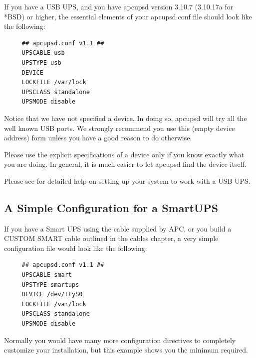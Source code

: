 \label{index-Configuration_002c-USB-65}
\label{index-USB_002c-configuration-66}
\label{index-Example_002c-USB-conf-67}
If you have a USB UPS, and you have apcupsd version 3.10.7 (3.10.17a for *BSD)
or higher, the essential elements of your apcupsd.conf file should look like 
the following: 

\footnotesize
\begin{verbatim}
     ## apcupsd.conf v1.1 ##
     UPSCABLE usb
     UPSTYPE usb
     DEVICE
     LOCKFILE /var/lock
     UPSCLASS standalone
     UPSMODE disable
\end{verbatim}
\normalsize

Notice that we have not specified a device. In doing so, apcupsd will try all
the well known USB ports. We strongly recommend you use this (empty device
address) form unless you have a good reason to do otherwise.  

Please use the explicit specifications of a device only if you know exactly
what you are doing. In general, it is much easier to let apcupsd find the
device itself.

Please see  for detailed help
on setting up your system to work with a USB UPS.

\label{A-Simple-Configuration-for-a-SmartUPS}

\subsection*{A Simple Configuration for a SmartUPS}

\label{index-Configuration_002c-SmartUPS-68}
\label{index-SmartUPS-configuration-69}
\label{index-Example_002c-SmartUPS-conf-70}
If you have a Smart UPS using the cable supplied by APC, or you build a CUSTOM
SMART cable outlined in the cables chapter, a very simple configuration file
would look like the following: 

\footnotesize
\begin{verbatim}
     ## apcupsd.conf v1.1 ##
     UPSCABLE smart
     UPSTYPE smartups
     DEVICE /dev/ttyS0
     LOCKFILE /var/lock
     UPSCLASS standalone
     UPSMODE disable
\end{verbatim}
\normalsize

Normally you would have many more configuration directives to completely
customize your installation, but this example shows you the minimum required. 

